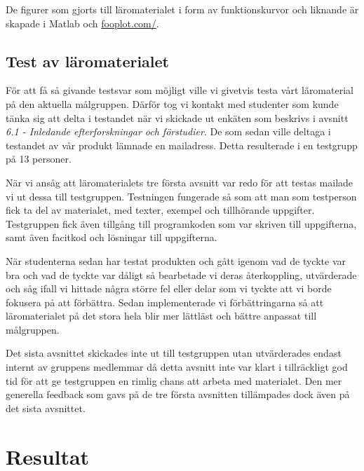 \documentclass[]{article}
\begin{document}
De figurer som gjorts till läromaterialet i form av funktionskurvor
och liknande är skapade i Matlab och \url{fooplot.com/}.

\subsection{Test av läromaterialet}

För att få så givande testsvar som möjligt ville vi givetvis testa
vårt läromaterial på den aktuella målgruppen. Därför tog vi kontakt
med studenter som kunde tänka sig att delta i testandet när vi
skickade ut enkäten som beskrivs i avsnitt \textit{6.1 -
Inledande efterforskningar och förstudier}. De som
sedan ville deltaga i testandet av vår produkt lämnade en
mailadress. Detta resulterade i en testgrupp på 13 personer.

När vi ansåg att läromaterialets tre första avsnitt var redo för att
testas mailade vi ut dessa till testgruppen. Testningen fungerade så
som att man som testperson fick ta del av materialet, med texter,
exempel och tillhörande uppgifter. Testgruppen fick även tillgång till
programkoden som var skriven till uppgifterna, samt även facitkod och
lösningar till uppgifterna.

När studenterna sedan har testat produkten och gått igenom vad de
tyckte var bra och vad de tyckte var dåligt så bearbetade vi deras
återkoppling, utvärderade och såg ifall vi hittade några större fel
eller delar som vi tyckte att vi borde fokusera på att
förbättra. Sedan implementerade vi förbättringarna så att
läromaterialet på det stora hela blir mer lättläst och bättre anpassat
till målgruppen.

Det sista avsnittet skickades inte ut till testgruppen utan
utvärderades endast internt av gruppens medlemmar då detta avsnitt
inte var klart i tillräckligt god tid för att ge testgruppen en rimlig
chans att arbeta med materialet. Den mer generella feedback som gavs
på de tre första avsnitten tillämpades dock även på det sista
avsnittet.

\section{Resultat}

\end{document}

